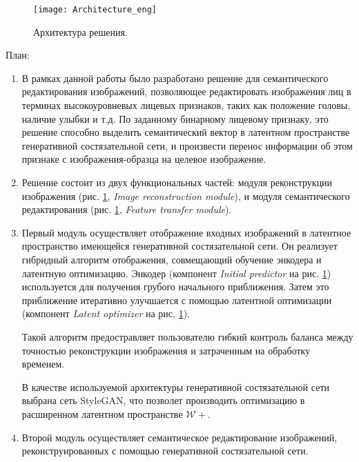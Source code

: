 
\begin{figure}[h]
\begin{center}
    \texttt{[image: Architecture\_eng]}
    \caption{Архитектура решения.}
    \label{fig:architecture}
\end{center}
\end{figure}

План:
\begin{enumerate}

\item
В рамках данной работы было разработано решение для семантического редактирования изображений, позволяющее редактировать изображения лиц в терминах высокоуровневых лицевых признаков, таких как положение головы, наличие улыбки и т.д.
По заданному бинарному лицевому признаку, это решение способно выделить семантический вектор в латентном пространстве генеративной состязательной сети, и произвести перенос информации об этом признаке с изображения-образца на целевое изображение.

\item
Решение состоит из двух функциональных частей: модуля реконструкции изображения (рис. \ref{fig:architecture}, \emph{Image reconstruction module}), и модуля семантического редактирования (рис. \ref{fig:architecture}, \emph{Feature transfer module}).

\item
Первый модуль осуществляет отображение входных изображений в латентное пространство имеющейся генеративной состязательной сети.
Он реализует гибридный алгоритм отображения, совмещающий обучение энкодера и латентную оптимизацию. 
Энкодер (компонент \emph{Initial predictor} на рис. \ref{fig:architecture}) используется для получения грубого начального приближения.
Затем это приближение итеративно улучшается с помощью латентной оптимизации (компонент \emph{Latent optimizer} на рис. \ref{fig:architecture}).

Такой алгоритм предостравляет пользователю гибкий контроль баланса между точностью реконструкции изображения и затраченным на обработку временем.

В качестве используемой архитектуры генеративной состязательной сети выбрана сеть StyleGAN, что позволет производить оптимизацию в расширенном латентном пространстве $\mathcal W+$.

\item
Второй модуль осуществляет семантическое редактирование изображений, реконструированных с помощью генеративной состязательной сети. 


\end{enumerate}
